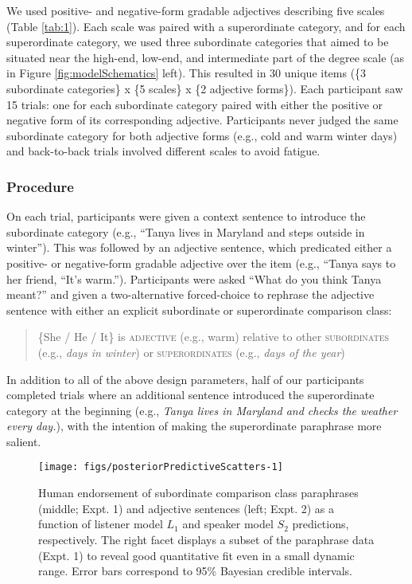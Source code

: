 \documentclass[doc]{apa6}
\begin{document}
We used positive- and negative-form gradable adjectives describing five
scales (Table \ref{tab:1}). Each scale was paired with a superordinate
category, and for each superordinate category, we used three subordinate
categories that aimed to be situated near the high-end, low-end, and
intermediate part of the degree scale (as in Figure
\ref{fig:modelSchematics} left). This resulted in 30 unique items (\{3
subordinate categories\} x \{5 scales\} x \{2 adjective forms\}). Each
participant saw 15 trials: one for each subordinate category paired with
either the positive or negative form of its corresponding adjective.
Participants never judged the same subordinate category for both
adjective forms (e.g., cold and warm winter days) and back-to-back
trials involved different scales to avoid fatigue.


\subsubsection{Procedure}

On each trial, participants were given a context sentence to introduce
the subordinate category (e.g., ``Tanya lives in Maryland and
steps outside in winter''). This was followed by an adjective sentence,
which predicated either a positive- or negative-form gradable adjective
over the item (e.g., ``Tanya says to her friend, ``It's
warm.''). Participants were asked ``What do you think Tanya
meant?'' and given a two-alternative forced-choice to rephrase the
adjective sentence with either an explicit subordinate or superordinate
comparison class:

\begin{quote}
\{She / He / It\} is \textsc{adjective} (e.g., warm) relative to other
\textsc{subordinates} (e.g., \emph{days in winter}) or
\textsc{superordinates} (e.g., \emph{days of the year})
\end{quote}

In addition to all of the above design parameters, half of our
participants completed trials where an additional sentence introduced
the superordinate category at the beginning (e.g., \emph{Tanya lives in
Maryland and checks the weather every day.}), with the intention of
making the superordinate paraphrase more salient.

\begin{figure*}[htb]

{\centering \texttt{[image: figs/posteriorPredictiveScatters-1]} 

}

\caption{Human endorsement of subordinate comparison class paraphrases (middle; Expt. 1) and adjective sentences (left; Expt. 2) as a function of listener model $L_1$ and speaker model $S_2$ predictions, respectively. The right facet displays a subset of the paraphrase data (Expt. 1) to reveal good quantitative fit even in a small dynamic range. Error bars correspond to 95\% Bayesian credible intervals.}\label{fig:posteriorPredictiveScatters}
\end{figure*}
\end{document}

